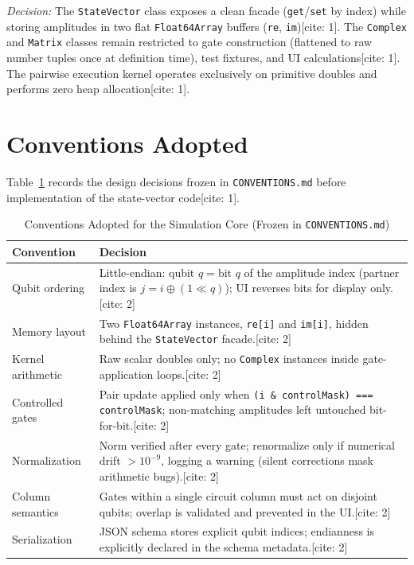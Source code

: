 \documentclass[conference]{IEEEtran}
\begin{document}
\textit{Decision:} The \texttt{StateVector} class exposes a clean facade (\texttt{get}/\texttt{set} by index) while storing amplitudes in two flat \texttt{Float64Array} buffers (\texttt{re}, \texttt{im})[cite: 1]. The \texttt{Complex} and \texttt{Matrix} classes remain restricted to gate construction (flattened to raw number tuples once at definition time), test fixtures, and UI calculations[cite: 1]. The pairwise execution kernel operates exclusively on primitive doubles and performs zero heap allocation[cite: 1].

\section{Conventions Adopted}
\label{sec:conventions}
Table~\ref{tab:conventions} records the design decisions frozen in \texttt{CONVENTIONS.md} before implementation of the state-vector code[cite: 1].

\begin{table}[t]
\caption{Conventions Adopted for the Simulation Core (Frozen in \texttt{CONVENTIONS.md})}
\label{tab:conventions}
\centering
\begin{tabular}{lp{12.5cm}}
\toprule
\textbf{Convention} & \textbf{Decision} \\
\midrule
Qubit ordering & Little-endian: qubit $q = \text{bit } q$ of the amplitude index (partner index is $j = i \oplus (1 \ll q)$); UI reverses bits for display only.[cite: 2] \\
\addlinespace
Memory layout & Two \texttt{Float64Array} instances, \texttt{re[i]} and \texttt{im[i]}, hidden behind the \texttt{StateVector} facade.[cite: 2] \\
\addlinespace
Kernel arithmetic & Raw scalar doubles only; no \texttt{Complex} instances inside gate-application loops.[cite: 2] \\
\addlinespace
Controlled gates & Pair update applied only when \texttt{(i \& controlMask) === controlMask}; non-matching amplitudes left untouched bit-for-bit.[cite: 2] \\
\addlinespace
Normalization & Norm verified after every gate; renormalize only if numerical drift $> 10^{-9}$, logging a warning (silent corrections mask arithmetic bugs).[cite: 2] \\
\addlinespace
Column semantics & Gates within a single circuit column must act on disjoint qubits; overlap is validated and prevented in the UI.[cite: 2] \\
\addlinespace
Serialization & JSON schema stores explicit qubit indices; endianness is explicitly declared in the schema metadata.[cite: 2] \\
\bottomrule
\end{tabular}
\end{table}
\end{document}

